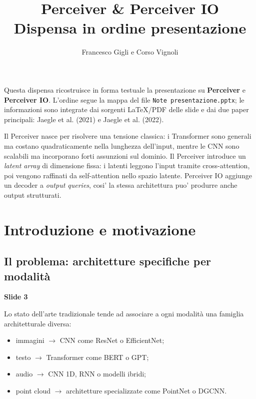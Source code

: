 \documentclass[11pt,a4paper]{article}
\title{\textbf{\textcolor{deepblue}{Perceiver \& Perceiver IO}}\\
  \large Dispensa in ordine presentazione}
\author{Francesco Gigli e Corso Vignoli}
\date{}
\newcommand{\slide}[1]{\textcolor{mainblue}{\textbf{Slide #1}}}
\begin{document}
\maketitle

\begin{center}
\begin{minipage}{0.88\linewidth}
\small
Questa dispensa ricostruisce in forma testuale la presentazione su
\textbf{Perceiver} e \textbf{Perceiver IO}. L'ordine segue la mappa del file
\texttt{Note presentazione.pptx}; le informazioni sono integrate dai sorgenti
LaTeX/PDF delle slide e dai due paper principali: Jaegle et al. (2021) e
Jaegle et al. (2022).
\end{minipage}
\end{center}

\vspace{0.5em}
\begin{takeawaybox}[title={Idea in 60 secondi}]
Il Perceiver nasce per risolvere una tensione classica: i Transformer sono
generali ma costano quadraticamente nella lunghezza dell'input, mentre le CNN
sono scalabili ma incorporano forti assunzioni sul dominio. Il Perceiver
introduce un \emph{latent array} di dimensione fissa: i latenti leggono l'input
tramite cross-attention, poi vengono raffinati da self-attention nello spazio
latente. Perceiver IO aggiunge un decoder a \emph{output queries}, cosi' la
stessa architettura puo' produrre anche output strutturati.
\end{takeawaybox}

{\small\tableofcontents}
\clearpage

\section{Introduzione e motivazione}

\subsection{Il problema: architetture specifiche per modalit\`a}
\slide{3}

Lo stato dell'arte tradizionale tende ad associare a ogni modalit\`a una
famiglia architetturale diversa:
\begin{itemize}
  \item immagini $\rightarrow$ CNN come ResNet o EfficientNet;
  \item testo $\rightarrow$ Transformer come BERT o GPT;
  \item audio $\rightarrow$ CNN 1D, RNN o modelli ibridi;
  \item point cloud $\rightarrow$ architetture specializzate come PointNet o DGCNN.
\end{itemize}
\end{document}
